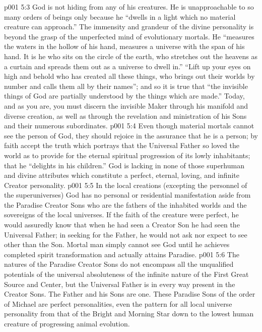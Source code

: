 \vs p001 5:3 God is not hiding from any of his creatures. He is unapproachable to so many orders of beings only because he “dwells in a light which no material creature can approach.” The immensity and grandeur of the divine personality is beyond the grasp of the unperfected mind of evolutionary mortals. He “measures the waters in the hollow of his hand, measures a universe with the span of his hand. It is he who sits on the circle of the earth, who stretches out the heavens as a curtain and spreads them out as a universe to dwell in.” “Lift up your eyes on high and behold who has created all these things, who brings out their worlds by number and calls them all by their names”; and so it is true that “the invisible things of God are partially understood by the things which are made.” Today, and as you are, you must discern the invisible Maker through his manifold and diverse creation, as well as through the revelation and ministration of his Sons and their numerous subordinates.
\vs p001 5:4 Even though material mortals cannot see the person of God, they should rejoice in the assurance that he is a person; by faith accept the truth which portrays that the Universal Father so loved the world as to provide for the eternal spiritual progression of its lowly inhabitants; that he “delights in his children.” God is lacking in none of those superhuman and divine attributes which constitute a perfect, eternal, loving, and infinite Creator personality.
\vs p001 5:5 \pc In the local creations (excepting the personnel of the superuniverses) God has no personal or residential manifestation aside from the Paradise Creator Sons who are the fathers of the inhabited worlds and the sovereigns of the local universes. If the faith of the creature were perfect, he would assuredly know that when he had seen a Creator Son he had seen the Universal Father; in seeking for the Father, he would not ask nor expect to see other than the Son. Mortal man simply cannot see God until he achieves completed spirit transformation and actually attains Paradise.
\vs p001 5:6 The natures of the Paradise Creator Sons do not encompass all the unqualified potentials of the universal absoluteness of the infinite nature of the First Great Source and Center, but the Universal Father is in every way  present in the Creator Sons. The Father and his Sons are one. These Paradise Sons of the order of Michael are perfect personalities, even the pattern for all local universe personality from that of the Bright and Morning Star down to the lowest human creature of progressing animal evolution.
